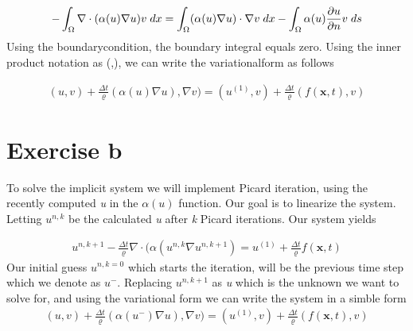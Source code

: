 \documentclass[a4paper,norsk]{article}
\begin{document}
\begin{align}
-\int_\Omega \nabla \cdot (\alpha(u) \nabla u) v \hspace{1mm} dx = 
\int_\Omega (\alpha(u) \nabla u) \cdot \nabla v \hspace{1mm} dx 
- \int_\Omega \alpha(u) \frac{\partial u}{\partial n} v \hspace{1mm}ds
\end{align} 
Using the boundarycondition, the boundary integral equals zero. Using the inner product notation as (,\hspace{2mm}), we can write the variationalform as follows

\begin{align}
(u, v) + \frac{\Delta t}{\varrho}(\alpha(u) \nabla u),\nabla v) = 
(u^{(1)},v) + \frac{\Delta t}{\varrho} (f(\textbf{x}, t), v)
\end{align}

\section*{Exercise b}
To solve the implicit system we will implement Picard iteration, using the recently computed \textit{u} in the $\alpha(u)$ function. Our goal is to linearize the system. Letting $u^{n,k}$ be the calculated \textit{u} after \textit{k} Picard iterations. Our system yields

\begin{align}
u^{n,k+1} - \frac{\Delta t}{\varrho} \nabla \cdot (\alpha(u^{n,k}\nabla u^{n,k+1} ) =
u^{(1)} + \frac{\Delta t}{\varrho} f(\textbf{x}, t)
\end{align}
Our initial guess $u^{n,k=0}$ which starts the iteration, will be the previous time step which we denote as $u^-$. Replacing 
$u^{n,k+1}$ as \textit{u} which is the unknown we want to solve for, 
and using the variational form we can write the system in a simble form
\begin{align}
(u, v) + \frac{\Delta t}{\varrho}(\alpha(u^-) \nabla u),\nabla v) = 
(u^{(1)},v) + \frac{\Delta t}{\varrho} (f(\textbf{x}, t), v)
\end{align}
\end{document}
